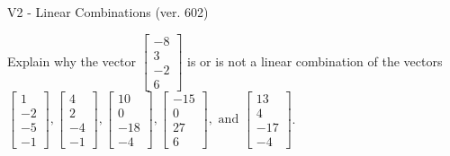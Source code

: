 \begin{exercise}
  \begin{exerciseTitle}V2 - Linear Combinations (ver. 602)\end{exerciseTitle}
  \begin{exerciseStatement}
    Explain why the vector \(\left[\begin{array}{c}
-8 \\
3 \\
-2 \\
6
\end{array}\right]\)  is or is not a linear 
	combination of the vectors \(\left[\begin{array}{c}
1 \\
-2 \\
-5 \\
-1
\end{array}\right] , \left[\begin{array}{c}
4 \\
2 \\
-4 \\
-1
\end{array}\right] , \left[\begin{array}{c}
10 \\
0 \\
-18 \\
-4
\end{array}\right] , \left[\begin{array}{c}
-15 \\
0 \\
27 \\
6
\end{array}\right] , \text{ and } \left[\begin{array}{c}
13 \\
4 \\
-17 \\
-4
\end{array}\right]\).
	



\end{exerciseStatement}
\end{exercise}

